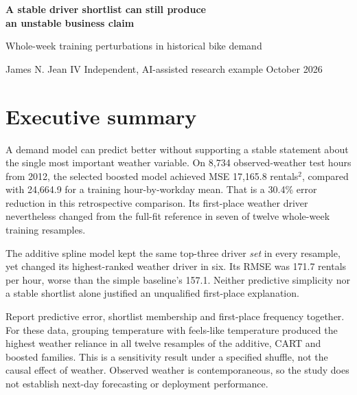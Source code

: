\documentclass[11pt,letterpaper]{article}
\begin{document}
{\LARGE\bfseries A stable driver shortlist can still produce\\an unstable business claim\par}
\vspace{8pt}
{\large Whole-week training perturbations in historical bike demand\par}
{\small James N. Jean IV \quad Independent, AI-assisted research example  October 2026\par}

\section*{Executive summary}
A demand model can predict better without supporting a stable statement about the single most important weather variable. On 8,734 observed-weather test hours from 2012, the selected boosted model achieved MSE 17,165.8 rentals$^2$, compared with 24,664.9 for a training hour-by-workday mean. That is a 30.4\% error reduction in this retrospective comparison. Its first-place weather driver nevertheless changed from the full-fit reference in seven of twelve whole-week training resamples.

The additive spline model kept the same top-three driver \emph{set} in every resample, yet changed its highest-ranked weather driver in six. Its RMSE was 171.7 rentals per hour, worse than the simple baseline's 157.1. Neither predictive simplicity nor a stable shortlist alone justified an unqualified first-place explanation.

Report predictive error, shortlist membership and first-place frequency together. For these data, grouping temperature with feels-like temperature produced the highest weather reliance in all twelve resamples of the additive, CART and boosted families. This is a sensitivity result under a specified shuffle, not the causal effect of weather. Observed weather is contemporaneous, so the study does not establish next-day forecasting or deployment performance.
\end{document}
